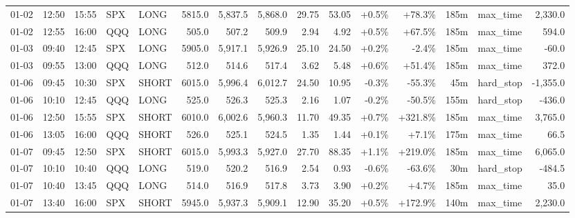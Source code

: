 \documentclass[11pt,a4paper,twoside]{article}
\begin{document}
\begin{landscape}
\begin{center}
\begin{longtable}{>{\color{txtmain}}l l l l l r r r r r r r r >{\color{txtmain}}l r}
01-02 & 12:50 & 15:55 & SPX & LONG & 5815.0 & 5,837.5 & 5,868.0 & 29.75 & 53.05 & \textcolor{wingreen}{+0.5\%} & \textcolor{wingreen}{+78.3\%} & 185m & max\_time & \textcolor{wingreen}{2,330.0} \\
01-02 & 12:55 & 16:00 & QQQ & LONG & 505.0 & 507.2 & 509.9 & 2.94 & 4.92 & \textcolor{wingreen}{+0.5\%} & \textcolor{wingreen}{+67.5\%} & 185m & max\_time & \textcolor{wingreen}{594.0} \\
01-03 & 09:40 & 12:45 & SPX & LONG & 5905.0 & 5,917.1 & 5,926.9 & 25.10 & 24.50 & \textcolor{wingreen}{+0.2\%} & \textcolor{lossred}{-2.4\%} & 185m & max\_time & \textcolor{lossred}{-60.0} \\
01-03 & 09:55 & 13:00 & QQQ & LONG & 512.0 & 514.6 & 517.4 & 3.62 & 5.48 & \textcolor{wingreen}{+0.6\%} & \textcolor{wingreen}{+51.4\%} & 185m & max\_time & \textcolor{wingreen}{372.0} \\
01-06 & 09:45 & 10:30 & SPX & SHORT & 6015.0 & 5,996.4 & 6,012.7 & 24.50 & 10.95 & \textcolor{lossred}{-0.3\%} & \textcolor{lossred}{-55.3\%} & 45m & hard\_stop & \textcolor{lossred}{-1,355.0} \\
01-06 & 10:10 & 12:45 & QQQ & LONG & 525.0 & 526.3 & 525.3 & 2.16 & 1.07 & \textcolor{lossred}{-0.2\%} & \textcolor{lossred}{-50.5\%} & 155m & hard\_stop & \textcolor{lossred}{-436.0} \\
01-06 & 12:50 & 15:55 & SPX & SHORT & 6010.0 & 6,002.6 & 5,960.3 & 11.70 & 49.35 & \textcolor{wingreen}{+0.7\%} & \textcolor{wingreen}{+321.8\%} & 185m & max\_time & \textcolor{wingreen}{3,765.0} \\
01-06 & 13:05 & 16:00 & QQQ & SHORT & 526.0 & 525.1 & 524.5 & 1.35 & 1.44 & \textcolor{wingreen}{+0.1\%} & \textcolor{wingreen}{+7.1\%} & 175m & max\_time & \textcolor{wingreen}{66.5} \\
01-07 & 09:45 & 12:50 & SPX & SHORT & 6015.0 & 5,993.3 & 5,927.0 & 27.70 & 88.35 & \textcolor{wingreen}{+1.1\%} & \textcolor{wingreen}{+219.0\%} & 185m & max\_time & \textcolor{wingreen}{6,065.0} \\
01-07 & 10:10 & 10:40 & QQQ & LONG & 519.0 & 520.2 & 516.9 & 2.54 & 0.93 & \textcolor{lossred}{-0.6\%} & \textcolor{lossred}{-63.6\%} & 30m & hard\_stop & \textcolor{lossred}{-484.5} \\
01-07 & 10:40 & 13:45 & QQQ & LONG & 514.0 & 516.9 & 517.8 & 3.73 & 3.90 & \textcolor{wingreen}{+0.2\%} & \textcolor{wingreen}{+4.7\%} & 185m & max\_time & \textcolor{wingreen}{35.0} \\
01-07 & 13:40 & 16:00 & SPX & SHORT & 5945.0 & 5,937.3 & 5,909.1 & 12.90 & 35.20 & \textcolor{wingreen}{+0.5\%} & \textcolor{wingreen}{+172.9\%} & 140m & max\_time & \textcolor{wingreen}{2,230.0} \\

\end{longtable}
\end{center}
\end{landscape}
\end{document}
